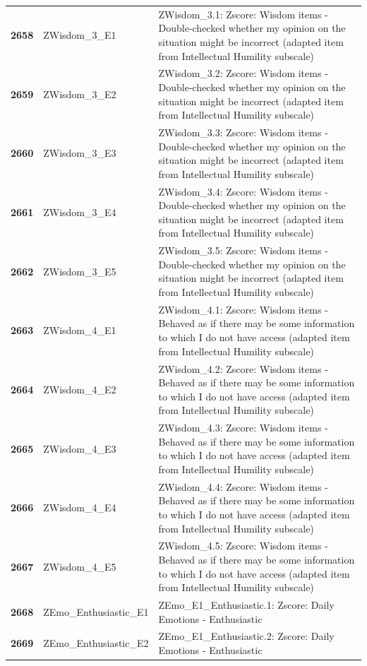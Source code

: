 \documentclass[
  letterpaper,
  DIV=11,
  numbers=noendperiod]{scrartcl}
\begin{document}
\begin{longtable}[t]{>{}cll}
\textbf{2658} & ZWisdom\_3\_E1 & ZWisdom\_3.1: Zscore:  Wisdom items - Double-checked whether my opinion on the situation might be incorrect (adapted item from Intellectual Humility subscale)\\
\textbf{2659} & ZWisdom\_3\_E2 & ZWisdom\_3.2: Zscore:  Wisdom items - Double-checked whether my opinion on the situation might be incorrect (adapted item from Intellectual Humility subscale)\\
\textbf{2660} & ZWisdom\_3\_E3 & ZWisdom\_3.3: Zscore:  Wisdom items - Double-checked whether my opinion on the situation might be incorrect (adapted item from Intellectual Humility subscale)\\
\addlinespace
\textbf{2661} & ZWisdom\_3\_E4 & ZWisdom\_3.4: Zscore:  Wisdom items - Double-checked whether my opinion on the situation might be incorrect (adapted item from Intellectual Humility subscale)\\
\textbf{2662} & ZWisdom\_3\_E5 & ZWisdom\_3.5: Zscore:  Wisdom items - Double-checked whether my opinion on the situation might be incorrect (adapted item from Intellectual Humility subscale)\\
\textbf{2663} & ZWisdom\_4\_E1 & ZWisdom\_4.1: Zscore:  Wisdom items - Behaved as if there may be some information to which I do not have access (adapted item from Intellectual Humility subscale)\\
\textbf{2664} & ZWisdom\_4\_E2 & ZWisdom\_4.2: Zscore:  Wisdom items - Behaved as if there may be some information to which I do not have access (adapted item from Intellectual Humility subscale)\\
\textbf{2665} & ZWisdom\_4\_E3 & ZWisdom\_4.3: Zscore:  Wisdom items - Behaved as if there may be some information to which I do not have access (adapted item from Intellectual Humility subscale)\\
\addlinespace
\textbf{2666} & ZWisdom\_4\_E4 & ZWisdom\_4.4: Zscore:  Wisdom items - Behaved as if there may be some information to which I do not have access (adapted item from Intellectual Humility subscale)\\
\textbf{2667} & ZWisdom\_4\_E5 & ZWisdom\_4.5: Zscore:  Wisdom items - Behaved as if there may be some information to which I do not have access (adapted item from Intellectual Humility subscale)\\
\textbf{2668} & ZEmo\_Enthusiastic\_E1 & ZEmo\_E1\_Enthusiastic.1: Zscore:  Daily Emotions - Enthusiastic\\
\textbf{2669} & ZEmo\_Enthusiastic\_E2 & ZEmo\_E1\_Enthusiastic.2: Zscore:  Daily Emotions - Enthusiastic\\

\end{longtable}
\end{document}
